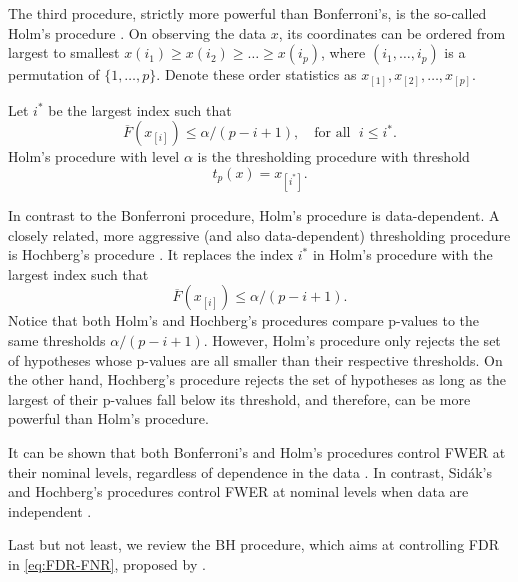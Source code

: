 The third procedure, strictly more powerful than Bonferroni's, is the so-called Holm's procedure \citep{holm1979simple}.
On observing the data $x$, its coordinates can be ordered from largest to smallest
$x(i_1) \ge x(i_2)  \ge \ldots \ge x(i_p)$,
where $(i_1, \ldots, i_p)$ is a permutation of $\{1, \ldots, p\}$. 
Denote these order statistics as $x_{[1]}, x_{[2]}, \ldots, x_{[p]}$.
\begin{definition}
Let $i^*$ be the largest index such that
$$
\overline{F}(x_{[i]}) \le \alpha / (p-i+1),\quad \text{for all }\;i\le i^*.
$$
Holm's procedure with level $\alpha$ is the thresholding procedure with threshold
\begin{equation} \label{eq:Holm-procedure}
    t_p(x) = x_{[i^*]}.
\end{equation}
\end{definition}
In contrast to the Bonferroni procedure, Holm's procedure is data-dependent.
A closely related, more aggressive (and also data-dependent) thresholding procedure is Hochberg's procedure \citep{hochberg1988sharper}.
It replaces the index $i^*$ in Holm's procedure with the largest index such that
$$
\overline{F}(x_{[i]}) \le \alpha / (p-i+1).
$$
Notice that both Holm's and Hochberg's procedures compare p-values to the same thresholds $\alpha / (p-i+1)$.
However, Holm's procedure only rejects the set of hypotheses whose p-values are all smaller than their respective thresholds.
On the other hand, Hochberg's procedure rejects the set of hypotheses as long as the largest of their p-values fall below its threshold, and therefore, can be more powerful than Holm's procedure. 

It can be shown that both Bonferroni's and Holm's procedures control FWER at their nominal levels, regardless of dependence in the 
data \citep{holm1979simple}. In contrast, Sid\'ak's and Hochberg's procedures control FWER at nominal levels when data are independent \citep{vsidak1967rectangular, hochberg1988sharper}. 

Last but not least, we review the \ac{BH} procedure, which aims at controlling \ac{FDR} in 
\eqref{eq:FDR-FNR}, proposed by  \cite{benjamini1995controlling}.

